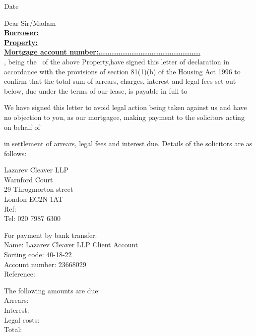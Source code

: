 \documentclass{article}
\begin{document}
\noindent\addressee \\
\street\\
\locality\\
\town\\
\postcode\\

\noindent Date \dateset\par
\vspace{5 mm}
\noindent Dear Sir/Madam\\
\textbf{\underline{Borrower: \borrower}}\\
\noindent\textbf{\underline{Property: \property}}
\vspace{2 mm}\\
\textbf{\underline{Mortgage account number:..............................................}}\\
\weborrower, being the \lessees\ of the above Property,have signed this letter of declaration in accordance with the provisions of section 81(1)(b) of the Housing Act 1996 to confirm that the total sum of arrears, charges, interest and legal fees set out below, due under the terms of our lease, is payable in full to \address. We have signed this letter to avoid legal action being taken against
us and have no objection to you, as our mortgagee, making payment to the solicitors acting
on behalf of \address\ in settlement of arrears, legal fees and interest due. Details of the solicitors are as follows:

\begin{multicols}{2}
\noindent Lazarev Cleaver LLP\\
Warnford Court\\
29 Throgmorton street\\
London EC2N 1AT\\
Ref: \caseno\\
Tel: 020 7987 6300

\columnbreak

\noindent For payment by bank transfer:\\
Name: Lazarev Cleaver LLP Client Account\\
Sorting code: 40-18-22\\
Account number: 23668029\\
Reference: \caseno

\end{multicols}
\par
\noindent The following amounts are due:\\
\indent Arrears: \arrears\\
\indent Interest: \interest\\
\indent Legal costs: \legalcosts\\
\indent Total: \total
\end{document}
